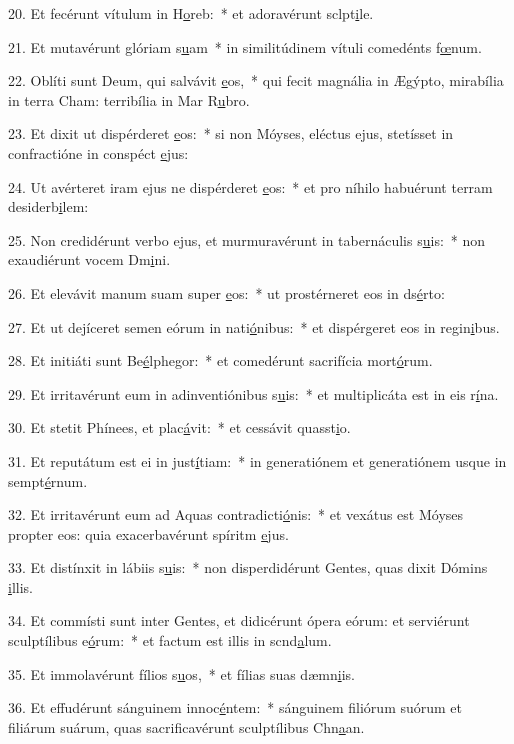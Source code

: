 20. Et fecérunt vítulum in H\uline{o}reb:~* et adoravérunt sclpt\uline{i}le.\par 
21. Et mutavérunt glóriam s\uline{u}am~* in similitúdinem vítuli comedénts f\uline{œ}num.\par 
22. Oblíti sunt Deum, qui salvávit \uline{e}os,~* qui fecit magnália in Ægýpto, mirabília in terra Cham: terribília in Mar R\uline{u}bro.\par 
23. Et dixit ut dispérderet \uline{e}os:~* si non Móyses, eléctus ejus, stetísset in confractióne in conspéct \uline{e}jus:\par 
24. Ut avérteret iram ejus ne dispérderet \uline{e}os:~* et pro níhilo habuérunt terram desiderb\uline{i}lem:\par 
25. Non credidérunt verbo ejus, et murmuravérunt in tabernáculis s\uline{u}is:~* non exaudiérunt vocem Dm\uline{i}ni.\par 
26. Et elevávit manum suam super \uline{e}os:~* ut prostérneret eos in ds\uline{é}rto:\par 
27. Et ut dejíceret semen eórum in nati\uline{ó}nibus:~* et dispérgeret eos in regin\uline{i}bus.\par 
28. Et initiáti sunt Be\uline{é}lphegor:~* et comedérunt sacrifícia mort\uline{ó}rum.\par 
29. Et irritavérunt eum in adinventiónibus s\uline{u}is:~* et multiplicáta est in eis r\uline{í}na.\par 
30. Et stetit Phínees, et plac\uline{á}vit:~* et cessávit quasst\uline{i}o.\par 
31. Et reputátum est ei in just\uline{í}tiam:~* in generatiónem et generatiónem usque in sempt\uline{é}rnum.\par 
32. Et irritavérunt eum ad Aquas contradicti\uline{ó}nis:~* et vexátus est Móyses propter eos: quia exacerbavérunt spíritm \uline{e}jus.\par 
33. Et distínxit in lábiis s\uline{u}is:~* non disperdidérunt Gentes, quas dixit Dómins \uline{i}llis.\par 
34. Et commísti sunt inter Gentes, et didicérunt ópera eórum: et serviérunt sculptílibus e\uline{ó}rum:~* et factum est illis in scnd\uline{a}lum.\par 
35. Et immolavérunt fílios s\uline{u}os,~* et fílias suas dæmn\uline{i}is.\par 
36. Et effudérunt sánguinem innoc\uline{é}ntem:~* sánguinem filiórum suórum et filiárum suárum, quas sacrificavérunt sculptílibus Chn\uline{a}an.\par 
